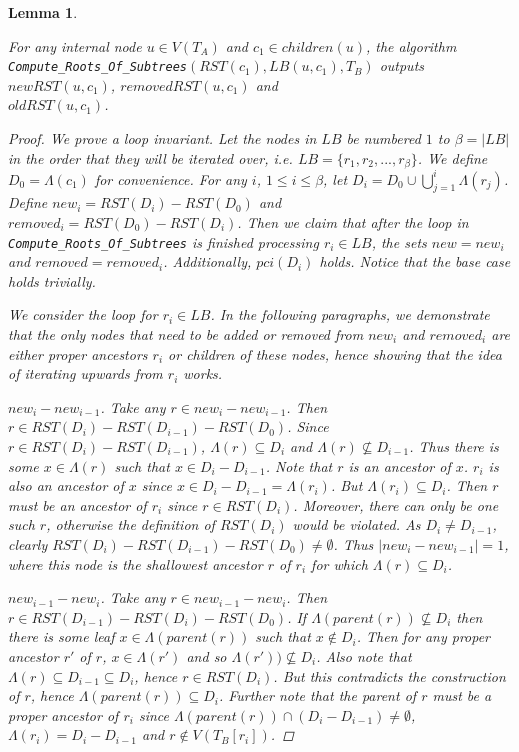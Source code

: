 \documentclass{article}
\newcommand{\leafset}{\Lambda}
\newtheorem{computerootsofsubtreescorrectness}[incompatibility]{Lemma}
\begin{document}
    \bigskip
    \begin{computerootsofsubtreescorrectness}
        \label{lem:computerootsofsubtreescorrectness}

        For any internal node $u \in V(T_A)$ and $c_1 \in children(u)$, the algorithm\\ %
        \texttt{Compute\_Roots\_Of\_Subtrees}$(RST(c_1), LB(u, c_1), T_B)$ outputs $newRST(u, c_1)$, $removedRST(u, c_1)$ and\\ %
        $oldRST(u, c_1)$.

        \begin{proof}
            We prove a loop invariant. Let the nodes in $LB$ be numbered $1$ to $\beta = |LB|$ in the order that they will be iterated over, i.e. $LB = \{r_1, r_2, ..., r_{\beta}\}$. We define $D_0 = \leafset(c_1)$ for convenience. For any $i$, $1 \leq i \leq \beta$, let $D_i = D_0 \cup \bigcup_{j = 1}^{i} \leafset(r_j)$. Define $new_i = RST(D_i) - RST(D_0)$ and $removed_i = RST(D_0) - RST(D_i)$. Then we claim that after the loop in \texttt{Compute\_Roots\_Of\_Subtrees} is finished processing $r_i \in LB$, the sets $new = new_i$ and $removed = removed_i$. Additionally, $pci(D_i)$ holds. Notice that the base case holds trivially.

            We consider the loop for $r_i \in LB$. In the following paragraphs, we demonstrate that the only nodes that need to be added or removed from $new_i$ and $removed_i$ are either proper ancestors $r_i$ or children of these nodes, hence showing that the idea of iterating upwards from $r_i$ works.

            \textit{$new_i - new_{i-1}$.} Take any $r \in new_i - new_{i-1}$. Then $r \in RST(D_i) - RST(D_{i-1}) - RST(D_0)$. Since $r \in RST(D_i) - RST(D_{i-1})$, $\leafset(r) \subseteq D_i$ and $\leafset(r) \not\subseteq D_{i-1}$. Thus there is some $x \in \leafset(r)$ such that $x \in D_i - D_{i-1}$. Note that $r$ is an ancestor of $x$. $r_i$ is also an ancestor of $x$ since $x \in D_i - D_{i-1} = \leafset(r_i)$. But $\leafset(r_i) \subseteq D_i$. Then $r$ must be an ancestor of $r_i$ since $r \in RST(D_i)$. Moreover, there can only be one such $r$, otherwise the definition of $RST(D_i)$ would be violated. As $D_i \neq D_{i-1}$, clearly $RST(D_i) - RST(D_{i-1}) - RST(D_0) \neq \emptyset$. Thus $|new_i - new_{i-1}| = 1$, where this node is the shallowest ancestor $r$ of $r_i$ for which $\leafset(r) \subseteq D_i$.

            \textit{$new_{i-1} - new_i$.} Take any $r \in new_{i-1} - new_i$. Then $r \in RST(D_{i-1}) - RST(D_i) - RST(D_0)$. If $\leafset(parent(r)) \not\subseteq D_i$ then there is some leaf $x \in \leafset(parent(r))$ such that $x \not\in D_i$. Then for any proper ancestor $r'$ of $r$, $x \in \leafset(r')$ and so $\leafset(r')) \not\subseteq D_i$. Also note that $\leafset(r) \subseteq D_{i-1} \subseteq D_i$, hence $r \in RST(D_i)$. But this contradicts the construction of $r$, hence $\leafset(parent(r)) \subseteq D_i$. Further note that the parent of $r$ must be a proper ancestor of $r_i$ since $\leafset(parent(r)) \cap (D_i - D_{i-1}) \neq \emptyset$, $\leafset(r_i) = D_i - D_{i-1}$ and $r \not\in V(T_B[r_i])$.


\end{proof}
\end{computerootsofsubtreescorrectness}
\end{document}
